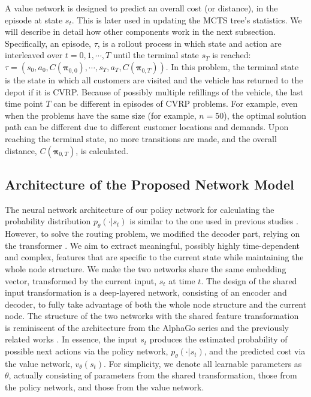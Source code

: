 \documentclass{article}
\newcommand\HWG[1]{ {\color{blue}#1} }
\begin{document}
A value network is designed to predict an overall cost (or distance), in the episode at state $s_t$. This is later used in updating the MCTS tree's statistics. We will describe in detail how other components work in the next subsection.
Specifically, an episode, $\tau$, is a rollout process in which state and action are interleaved over $t=0,1, \cdots, T$ until the terminal state $s_T$ is reached: $\tau=(s_0,  a_0, C(\boldsymbol{\pi}_{0,0}), \cdots, s_T,  a_T, C(\boldsymbol{\pi}_{0,T}))$. In this problem, the terminal state is the state in which all customers are visited and the vehicle has returned to the depot if it is CVRP. Because of possibly multiple refillings of the vehicle, the last time point $T$ can be different in episodes of CVRP problems. For example, even when the problems have the same size (for example, $n=50$), the optimal solution path can be different due to different customer locations and demands. Upon reaching the terminal state, no more transitions are made, and the overall distance, $C(\boldsymbol{\pi}_{0,T})$, is calculated.


\subsection{Architecture of the Proposed Network Model}

The neural network architecture of our policy network for calculating the probability distribution $p_\theta(\cdot|s_t)$ is similar to the one used in previous studies \cite{kool2018attention, kwonPOMOPolicyOptimization2021}. However, to solve the routing problem, we modified the decoder part, relying on the transformer \cite{vaswaniAttentionAllYou2017}. We aim to extract meaningful, possibly highly time-dependent and complex, features that are specific to the current state while maintaining the whole node structure.
We make the two networks share the same embedding vector, transformed by the current input, $s_t$ at time $t$. The design of the shared input transformation is a deep-layered network, consisting of an encoder and decoder, to fully take advantage of both the whole node structure and the current node.
The structure of the two networks with the shared feature transformation is reminiscent of the architecture from the AlphaGo series \cite{silverMasteringGameGo2016, silverMasteringGameGo2017} and the previously related works \cite{kool2018attention, kwonPOMOPolicyOptimization2021}. In essence, the input $s_t$ produces the estimated probability of possible next actions via the policy network, $p_\theta(\cdot |s_t)$, and the predicted cost via the value network, $v_\theta(s_t)$. For simplicity, we denote all learnable parameters as $\theta$, actually consisting of parameters from the shared transformation, those from the policy network, and those from the value network.
\end{document}
